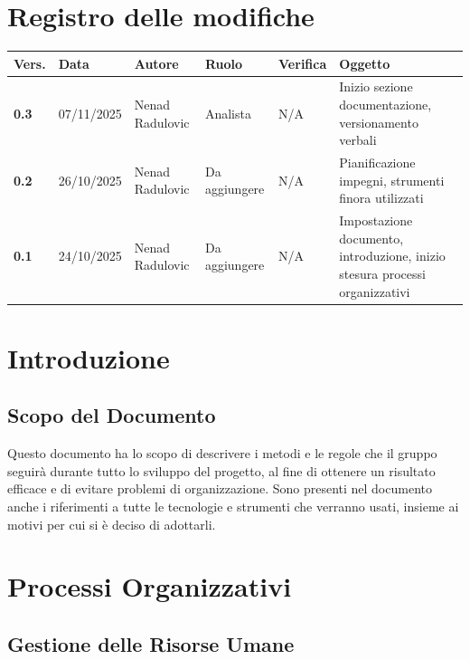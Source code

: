 \documentclass[a4paper,12pt]{article}
\begin{document}


\tableofcontents
\newpage

\section*{Registro delle modifiche}

\begin{tabularx}{\textwidth}{|l|l|X|l|X|X|}
    \hline
    \textbf{Vers.} & \textbf{Data} & \textbf{Autore} & \textbf{Ruolo} & \textbf{Verifica} & \textbf{Oggetto} \\
    \hline
    \textbf{0.3} & 07/11/2025 & Nenad Radulovic & Analista & N/A & Inizio sezione documentazione, versionamento verbali \\
    \textbf{0.2} & 26/10/2025 & Nenad Radulovic & Da aggiungere & N/A & Pianificazione impegni, strumenti finora utilizzati \\
    \textbf{0.1} & 24/10/2025 & Nenad Radulovic & Da aggiungere & N/A & Impostazione documento, introduzione, inizio stesura processi organizzativi \\
    \hline
\end{tabularx}

\newpage
\section{Introduzione}
\subsection{Scopo del Documento}
Questo documento ha lo scopo di descrivere i metodi e le regole che il gruppo seguirà durante tutto lo sviluppo del progetto, al fine di ottenere un risultato efficace e di evitare problemi di organizzazione. Sono presenti nel documento anche i riferimenti a tutte le tecnologie e strumenti che verranno usati, insieme ai motivi per cui si è deciso di adottarli.

\newpage
\section{Processi Organizzativi}


\subsection{Gestione delle Risorse Umane}
\end{document}
